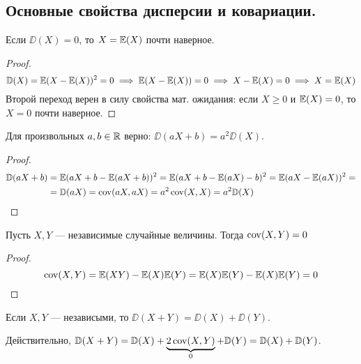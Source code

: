 \subsection{Основные свойства дисперсии и ковариации.}
\begin{proposal}
    Если $\DD(X) = 0$, то $X = \mathbb{E}(X)$ почти наверное.
\end{proposal}
\begin{proof}
    \[
        \mathbb{D}(X) = \mathbb{E}(X - \mathbb{E}(X))^2 = 0 \implies \mathbb{E}(X - \mathbb{E}(X)) = 0 \implies
        X - \mathbb{E}(X) = 0 \implies X = \mathbb{E}(X)
    \]
    Второй переход верен в силу свойства мат. ожидания: если $X \geq 0$ и $\mathbb{E}(X) = 0$, то $X = 0$ почти наверное.
\end{proof}
\begin{proposal}
    Для произвольных $a, b \in \mathbb{R}$ верно: $\DD(aX + b) = a^2\DD(X)$.
\end{proposal}
\begin{proof}
    \begin{align*}
        \mathbb{D}(aX + b) &= \mathbb{E}(aX + b - \mathbb{E}(aX + b))^2 = \mathbb{E}(aX + b - \mathbb{E}(aX) - b)^2 =
        \mathbb{E}(aX - \mathbb{E}(aX))^2 =\\
        &=\mathbb{D}(aX) = \operatorname{\mathop{\mathrm{cov}}}(aX, aX) = a^2\operatorname{\mathop{\mathrm{cov}}}(X, X) = a^2\mathbb{D}(X)
    \end{align*}
\end{proof}
\begin{proposal}
    Пусть $X, Y$ --- независимые случайные величины. Тогда $\operatorname{\mathop{\mathrm{cov}}}(X, Y) = 0$
\end{proposal}
\begin{proof}
    \[
        \operatorname{\mathop{\mathrm{cov}}}(X, Y) = \mathbb{E}(XY) - \mathbb{E}(X)\mathbb{E}(Y) = \mathbb{E}(X)\mathbb{E}(Y) - \mathbb{E}(X)\mathbb{E}(Y) = 0
    \]
\end{proof}
\begin{corollary}
    Если $X, Y$ --- независыми, то $\DD(X + Y) = \DD(X) + \DD(Y)$.

    Действительно, $\mathbb{D}(X + Y) = \mathbb{D}(X) + \underbrace{2\operatorname{\mathop{\mathrm{cov}}}(X, Y)}_{0} + \mathbb{D}(Y) = \mathbb{D}(X) + \mathbb{D}(Y)$.
\end{corollary}

